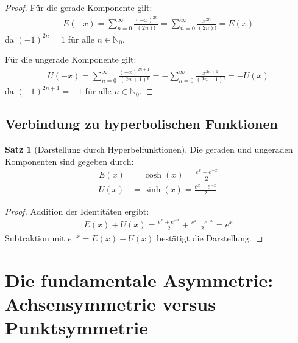 ﻿\documentclass[a4paper,12pt]{article}
\theoremstyle{definition}
\newtheorem{satz}{Satz}
\begin{document}
\begin{proof}
Für die gerade Komponente gilt:
\begin{align}
  E(-x) = \sum_{n=0}^{\infty} \frac{(-x)^{2n}}{(2n)!}
        = \sum_{n=0}^{\infty} \frac{x^{2n}}{(2n)!} = E(x)
\end{align}
da $(-1)^{2n} = 1$ für alle $n \in \mathbb{N}_0$.

Für die ungerade Komponente gilt:
\begin{align}
  U(-x) = \sum_{n=0}^{\infty} \frac{(-x)^{2n+1}}{(2n+1)!}
        = -\sum_{n=0}^{\infty} \frac{x^{2n+1}}{(2n+1)!} = -U(x)
\end{align}
da $(-1)^{2n+1} = -1$ für alle $n \in \mathbb{N}_0$.
\end{proof}

\subsection{Verbindung zu hyperbolischen Funktionen}

\begin{satz}[Darstellung durch Hyperbelfunktionen]
Die geraden und ungeraden Komponenten sind gegeben durch:
\begin{align}
  E(x) &= \cosh(x) = \frac{e^x + e^{-x}}{2} \\
  U(x) &= \sinh(x) = \frac{e^x - e^{-x}}{2}
\end{align}
\end{satz}

\begin{proof}
Addition der Identitäten ergibt:
\begin{align}
  E(x) + U(x)
    = \frac{e^x + e^{-x}}{2} + \frac{e^x - e^{-x}}{2} = e^x
\end{align}
Subtraktion mit $e^{-x} = E(x) - U(x)$ bestätigt die Darstellung.
\end{proof}

\section{Die fundamentale Asymmetrie: Achsensymmetrie versus Punktsymmetrie}
\end{document}
